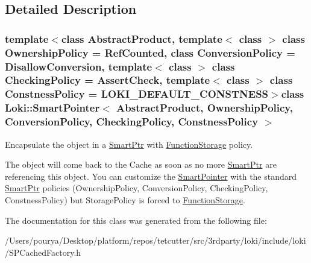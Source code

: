 \subsection{Detailed Description}
\subsubsection*{template$<$class Abstract\+Product, template$<$ class $>$ class Ownership\+Policy = Ref\+Counted, class Conversion\+Policy = Disallow\+Conversion, template$<$ class $>$ class Checking\+Policy = Assert\+Check, template$<$ class $>$ class Constness\+Policy = L\+O\+K\+I\+\_\+\+D\+E\+F\+A\+U\+L\+T\+\_\+\+C\+O\+N\+S\+T\+N\+E\+S\+S$>$class Loki\+::\+Smart\+Pointer$<$ Abstract\+Product, Ownership\+Policy, Conversion\+Policy, Checking\+Policy, Constness\+Policy $>$}

Encapsulate the object in a \hyperlink{classLoki_1_1SmartPtr}{Smart\+Ptr} with \hyperlink{classLoki_1_1FunctionStorage}{Function\+Storage} policy. 

The object will come back to the Cache as soon as no more \hyperlink{classLoki_1_1SmartPtr}{Smart\+Ptr} are referencing this object. You can customize the \hyperlink{classLoki_1_1SmartPointer}{Smart\+Pointer} with the standard \hyperlink{classLoki_1_1SmartPtr}{Smart\+Ptr} policies (Ownership\+Policy, Conversion\+Policy, Checking\+Policy, Constness\+Policy) but Storage\+Policy is forced to \hyperlink{classLoki_1_1FunctionStorage}{Function\+Storage}. 

The documentation for this class was generated from the following file\+:\begin{DoxyCompactItemize}
\item 
/\+Users/pourya/\+Desktop/platform/repos/tetcutter/src/3rdparty/loki/include/loki/S\+P\+Cached\+Factory.\+h\end{DoxyCompactItemize}

